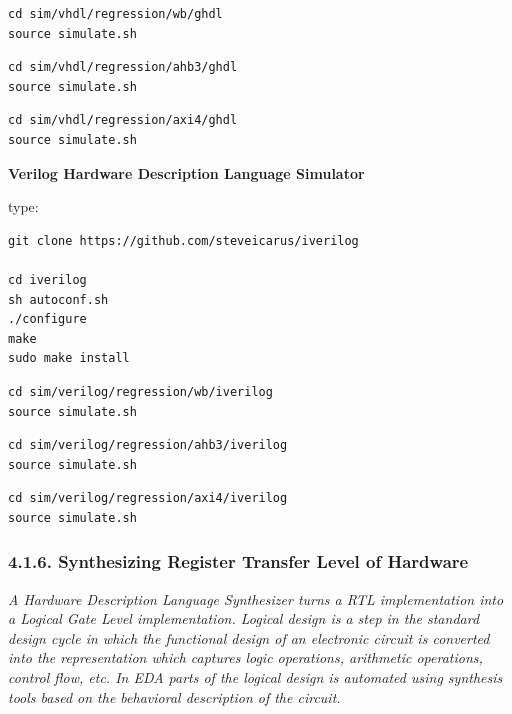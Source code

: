 \documentclass[
]{article}
\begin{document}
\begin{verbatim}
cd sim/vhdl/regression/wb/ghdl
source simulate.sh
\end{verbatim}

\begin{verbatim}
cd sim/vhdl/regression/ahb3/ghdl
source simulate.sh
\end{verbatim}

\begin{verbatim}
cd sim/vhdl/regression/axi4/ghdl
source simulate.sh
\end{verbatim}

\textbf{Verilog Hardware Description Language Simulator}

type:

\begin{verbatim}
git clone https://github.com/steveicarus/iverilog

cd iverilog
sh autoconf.sh
./configure
make
sudo make install
\end{verbatim}

\begin{verbatim}
cd sim/verilog/regression/wb/iverilog
source simulate.sh
\end{verbatim}

\begin{verbatim}
cd sim/verilog/regression/ahb3/iverilog
source simulate.sh
\end{verbatim}

\begin{verbatim}
cd sim/verilog/regression/axi4/iverilog
source simulate.sh
\end{verbatim}

\hypertarget{synthesizing-register-transfer-level-of-hardware-1}{%
\subsubsection{4.1.6. Synthesizing Register Transfer Level of
Hardware}\label{synthesizing-register-transfer-level-of-hardware-1}}

\emph{A Hardware Description Language Synthesizer turns a RTL
implementation into a Logical Gate Level implementation. Logical design
is a step in the standard design cycle in which the functional design of
an electronic circuit is converted into the representation which
captures logic operations, arithmetic operations, control flow, etc. In
EDA parts of the logical design is automated using synthesis tools based
on the behavioral description of the circuit.}
\end{document}
